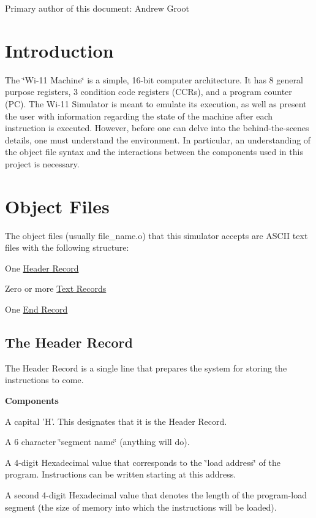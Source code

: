 Primary author of this document: Andrew Groot \hypertarget{index_intro}{}\section{Introduction}\label{index_intro}
The \char`\"{}Wi-\/11 Machine\char`\"{} is a simple, 16-\/bit computer architecture. It has 8 general purpose registers, 3 condition code registers (CCRs), and a program counter (PC). The Wi-\/11 Simulator is meant to emulate its execution, as well as present the user with information regarding the state of the machine after each instruction is executed. However, before one can delve into the behind-\/the-\/scenes details, one must understand the environment. In particular, an understanding of the object file syntax and the interactions between the components used in this project is necessary.\hypertarget{index_syntax}{}\section{Object Files}\label{index_syntax}
\begin{DoxyParagraph}{}
The object files (usually file\_\-name.o) that this simulator accepts are ASCII text files with the following structure: \begin{DoxyItemize}
\item One \hyperlink{index_header}{Header Record} \item Zero or more \hyperlink{index_text}{Text Records} \item One \hyperlink{index_end}{End Record}\end{DoxyItemize}

\end{DoxyParagraph}
\hypertarget{index_header}{}\subsection{The Header Record}\label{index_header}
\begin{DoxyParagraph}{}
The Header Record is a single line that prepares the system for storing the instructions to come. 
\end{DoxyParagraph}
\begin{DoxyParagraph}{}
{\bfseries Components} \begin{DoxyItemize}
\item A capital 'H'. This designates that it is the Header Record. \item A 6 character \char`\"{}segment name\char`\"{} (anything will do). \item A 4-\/digit Hexadecimal value that corresponds to the \char`\"{}load address\char`\"{} of the program. Instructions can be written starting at this address. \item A second 4-\/digit Hexadecimal value that denotes the length of the program-\/load segment (the size of memory into which the instructions will be loaded). \end{DoxyItemize}

\end{DoxyParagraph}
